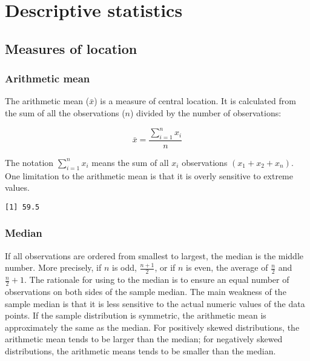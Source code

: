 \documentclass[]{book}
\newenvironment{Shaded}{\begin{snugshade}}{\end{snugshade}}
\newcommand{\KeywordTok}[1]{\textcolor[rgb]{0.13,0.29,0.53}{\textbf{#1}}}
\newcommand{\StringTok}[1]{\textcolor[rgb]{0.31,0.60,0.02}{#1}}
\newcommand{\CommentTok}[1]{\textcolor[rgb]{0.56,0.35,0.01}{\textit{#1}}}
\newcommand{\OperatorTok}[1]{\textcolor[rgb]{0.81,0.36,0.00}{\textbf{#1}}}
\newcommand{\NormalTok}[1]{#1}
\theoremstyle{definition}
\theoremstyle{definition}
\theoremstyle{definition}
\theoremstyle{remark}
\begin{document}
\chapter{Descriptive statistics}\label{descriptive-statistics}

\section{Measures of location}\label{measures-of-location}

\subsection{Arithmetic mean}\label{arithmetic-mean}

The arithmetic mean (\(\bar{x}\)) is a measure of central location. It
is calculated from the sum of all the observations (\({n}\)) divided by
the number of observations:

\[\bar{x}=\frac{\sum_{i=1}^nx_{i}}{n}\]

The notation \(\sum_{i=1}^nx_{i}\) means the sum of all \({x}_i\)
observations \(({x}_1+{x}_2+{x}_n)\). One limitation to the arithmetic
mean is that it is overly sensitive to extreme values.

\begin{Shaded}
\end{Shaded}

\begin{verbatim}
[1] 59.5
\end{verbatim}

\subsection{Median}\label{median}

If all observations are ordered from smallest to largest, the median is
the middle number. More precisely, if \({n}\) is odd, \(\frac{n+1}{2}\),
or if \({n}\) is even, the average of \(\frac{n}{2}\) and
\(\frac{n}{2}+1\). The rationale for using to the median is to ensure an
equal number of observations on both sides of the sample median. The
main weakness of the sample median is that it is less sensitive to the
actual numeric values of the data points. If the sample distribution is
symmetric, the arithmetic mean is approximately the same as the median.
For positively skewed distributions, the arithmetic mean tends to be
larger than the median; for negatively skewed distributions, the
arithmetic means tends to be smaller than the median.
\end{document}
